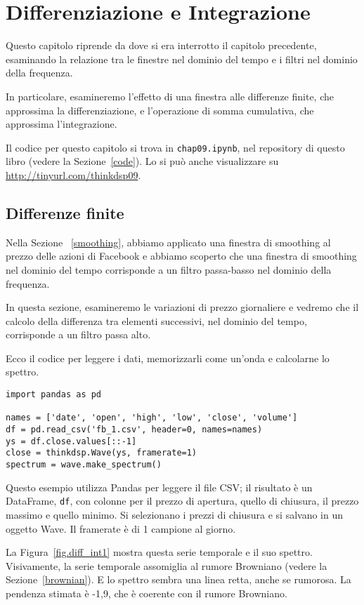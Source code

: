 \documentclass[12pt,a4paper]{book}
\begin{document}
\chapter{Differenziazione e Integrazione} \label{diffint} 

Questo capitolo riprende da dove si era interrotto il capitolo precedente, esaminando la relazione tra le finestre nel dominio del tempo e i filtri nel dominio della frequenza.

In particolare, esamineremo l'effetto di una finestra alle differenze finite, che approssima la differenziazione, e l'operazione di somma cumulativa, che approssima l'integrazione.

Il codice per questo capitolo si trova in {\tt chap09.ipynb}, nel repository di questo libro (vedere la Sezione~\ref{code}). Lo si può anche visualizzare su \url{http://tinyurl.com/thinkdsp09}.

\section{Differenze finite} \label{diffs} 

Nella Sezione ~\ref{smoothing}, abbiamo applicato una finestra di smoothing al prezzo delle azioni di Facebook e abbiamo scoperto che una finestra di smoothing nel dominio del tempo corrisponde a un filtro passa-basso nel dominio della frequenza.

In questa sezione, esamineremo le variazioni di prezzo giornaliere e vedremo che il calcolo della differenza tra elementi successivi, nel dominio del tempo, corrisponde a un filtro passa alto.

Ecco il codice per leggere i dati, memorizzarli come un'onda e calcolarne lo spettro.

\begin{verbatim} 
import pandas as pd

names = ['date', 'open', 'high', 'low', 'close', 'volume']
df = pd.read_csv('fb_1.csv', header=0, names=names)
ys = df.close.values[::-1]
close = thinkdsp.Wave(ys, framerate=1)
spectrum = wave.make_spectrum()
 \end{verbatim} 

Questo esempio utilizza Pandas per leggere il file CSV; il risultato è un DataFrame, {\tt df}, con colonne per il prezzo di apertura, quello di chiusura, il prezzo massimo e quello minimo. Si selezionano i prezzi di chiusura e si salvano in un oggetto Wave. Il framerate è di 1 campione al giorno.

La Figura~\ref{fig.diff_int1} mostra questa serie temporale e il suo spettro. Visivamente, la serie temporale assomiglia al rumore Browniano (vedere la Sezione~\ref{brownian}). E lo spettro sembra una linea retta, anche se rumorosa. La pendenza stimata è -1,9, che è coerente con il rumore Browniano.
\end{document}
